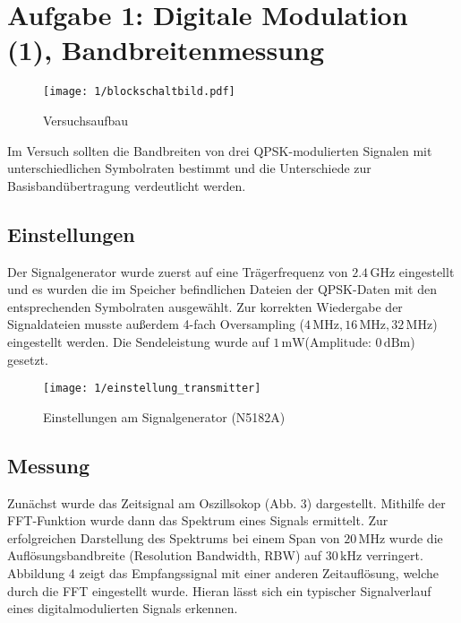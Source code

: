\documentclass[a4paper, 12pt]{article}
\begin{document}
  
  \clearpage
  \setcounter{page}{1}

  \section{Aufgabe 1: Digitale Modulation (1), Bandbreitenmessung}

  \begin{figure}[H]
    \begin{center}
      \texttt{[image: 1/blockschaltbild.pdf]}
    \end{center}
    \caption{Versuchsaufbau}
  \end{figure}
  Im Versuch sollten die Bandbreiten von drei QPSK-modulierten Signalen mit
  unterschiedlichen Symbolraten bestimmt und die Unterschiede zur
  Basisbandübertragung verdeutlicht werden.

  \subsection{Einstellungen}
  Der Signalgenerator wurde zuerst auf eine Trägerfrequenz von $2.4 \,
  \si{\giga\hertz}$ eingestellt und es wurden die im Speicher befindlichen
  Dateien der QPSK-Daten mit den entsprechenden Symbolraten ausgewählt. Zur korrekten
  Wiedergabe der Signaldateien musste außerdem 4-fach Oversampling ($4 \,
  \si{\mega\hertz}, 16 \, \si{\mega\hertz}, 32 \, \si{\mega\hertz} $) eingestellt werden. Die Sendeleistung wurde auf $1 \,
  \si{\milli\watt}$(Amplitude: $0 \, \si{\deci\bel}\textrm{m}$) gesetzt.

  \begin{figure}[H]
    \begin{center}
      \texttt{[image: 1/einstellung\_transmitter]}
    \end{center}
    \caption{Einstellungen am Signalgenerator (N5182A)}
  \end{figure}


  \subsection{Messung}

  Zunächst wurde das Zeitsignal am Oszillsokop (Abb. 3) dargestellt. 
  Mithilfe der FFT-Funktion wurde dann das Spektrum eines Signals ermittelt.
Zur erfolgreichen Darstellung des
  Spektrums bei einem Span von $20 \, \si{\mega\hertz}$ wurde die Auflösungsbandbreite
  (Resolution Bandwidth, RBW) auf $30 \, \si{\kilo\hertz}$ verringert. 
  Abbildung 4 zeigt das Empfangssignal mit einer anderen Zeitauflösung, welche
  durch die FFT eingestellt wurde. Hieran lässt sich ein typischer Signalverlauf
  eines digitalmodulierten Signals erkennen. 
\end{document}
